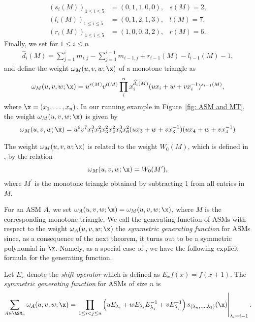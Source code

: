 \begin{align*}
(s_i(M))_{1 \leq i \leq 5} &= (0,1,1,0,0), & s(M) = 2,\\
(l_i(M))_{1 \leq i \leq 5} &= (0,1,2,1,3), & l(M) = 7,\\
(r_i(M))_{1 \leq i \leq 5} &= (1,0,0,3,2), & r(M) = 6. 
\end{align*}
Finally, we set for $1 \leq i \leq n$
\begin{align*}
\widehat d_i(M) = \sum_{j=1}^i m_{i,j} - \sum_{j=1}^{i-1} m_{i-1,j} +r_{i-1}(M) -l_{i-1}(M)-1,
\end{align*}
and define the weight $\omega_M(u,v,w;\x)$ of a monotone triangle as
\begin{equation}
\label{def:omega} 
\omega_M(u,v,w;\x) =  u^{r(M)} v^{l(M)}  \prod_i^{n} x_i^{\widehat d_i(M)} ( u x_i + w + v x_i^{-1} )^{s_{i-1}(M)} ,
\end{equation}
where $\x=(x_1,\ldots,x_n)$. In our running example in Figure~\ref{fig: ASM and MT}, the weight $\omega_M(u,v,w;\x)$ is given by
\[
\omega_M(u,v,w;\x) =  u^6  v^7 x_1^3 x_2^2 x_3^2 x_4^2 x_5^3 x_6^2 ( u x_3 + w + v x_3^{-1})( u x_4 + w +v x_4^{-1}) 
\]
\begin{rema}
\label{rem: slightly different weight}
The weight $\omega_M(u,v,w;\x)$ is related to the weight $W_0(M)$, which is defined in \cite[p. 17]{FischerSchreierAigner23}, by the relation 
\[
\omega_M(u,v,w;\x) =W_0(M^\prime),
\]
where $M^\prime$ is the monotone triangle obtained by subtracting $1$ from all entries in $M$.
\end{rema}

For an ASM $A$, we set $\omega_A(u,v,w;\x)=\omega_M(u,v,w;\x)$, where $M$ is the corresponding monotone triangle. We call the generating function of ASMs with respect to the weight $\omega_A(u,v,w;\x)$ the \emph{symmetric generating function} for ASMs since, as a consequence of the next theorem, it turns out to be a symmetric polynomial in $\x$.  Namely, as a special case of \cite[Theorem 3.1]{FischerSchreierAigner23}, we have the following explicit formula for the generating function.

\begin{thm}
\label{thm: sym gen fct via Operatoren}
Let $E_x$ denote the \emph{shift operator} which is defined as $E_x f(x)=f(x+1)$.
The \emph{symmetric generating function} for ASMs of size $n$ is
\begin{equation}
\label{eq: sym gen fct via Operatoren}
\sum_{A \in \ASM_n} \omega_A(u,v,w;\x) = \left.\prod_{1 \leq i < j \leq n} \left(u E_{\lambda_i}  + w E_{\lambda_i}E_{\lambda_j}^{-1} +  v E_{\lambda_j}^{-1}  \right) s_{(\lambda_n,\ldots,\lambda_1)}(\x)\right|_{\lambda_i=i-1}.
\end{equation}
\end{thm}

